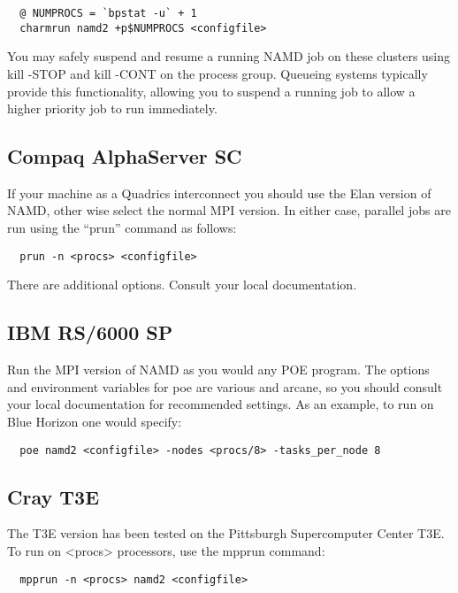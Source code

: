 \begin{verbatim}
  @ NUMPROCS = `bpstat -u` + 1
  charmrun namd2 +p$NUMPROCS <configfile>
\end{verbatim}

You may safely suspend and resume a running NAMD job on these clusters
using kill -STOP and kill -CONT on the process group.  Queueing systems
typically provide this functionality, allowing you to suspend a running
job to allow a higher priority job to run immediately.

\subsection{Compaq AlphaServer SC}

If your machine as a Quadrics interconnect you should use the Elan
version of NAMD, other wise select the normal MPI version.  In either
case, parallel jobs are run using the ``prun'' command as follows:

\begin{verbatim}
  prun -n <procs> <configfile>
\end{verbatim}

There are additional options.  Consult your local documentation.

\subsection{IBM RS/6000 SP}

Run the MPI version of NAMD as you would any POE program.  The options
and environment variables for poe are various and arcane, so you should
consult your local documentation for recommended settings.  As an
example, to run on Blue Horizon one would specify:

\begin{verbatim}
  poe namd2 <configfile> -nodes <procs/8> -tasks_per_node 8
\end{verbatim}

\subsection{Cray T3E}

The T3E version has been tested on the Pittsburgh Supercomputer Center
T3E.  To run on <procs> processors, use the mpprun command:

\begin{verbatim}
  mpprun -n <procs> namd2 <configfile>
\end{verbatim}

